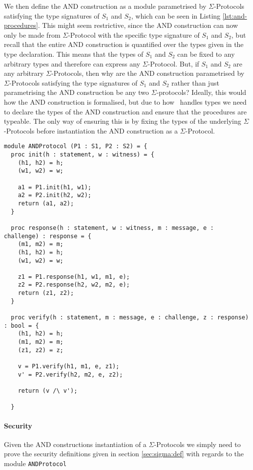 We then define the AND construction as a module parametrised by
$\Sigma$-Protocols satisfying the type signatures of $S_{1}$ and $S_{2}$, which
can be seen in Listing \ref{lst:and-procedures}. This might seem restrictive,
since the AND construction can now only be made from $\Sigma$-Protocol with the
specific type signature of $S_{1}$ and $S_{2}$, but recall that the entire AND
construction is quantified over the types given in the type declaration. This
means that the types of $S_{1}$ and $S_{2}$ can be fixed to any arbitrary types
and therefore can express any $\Sigma$-Protocol.
But, if $S_{1}$ and $S_{2}$ are any arbitrary $\Sigma$-Protocols, then why are
the AND construction parametrised by $\Sigma$-Protocols satisfying the type
signatures of $S_{1}$ and $S_{2}$ rather than just parametrising the AND
construction be any two $\Sigma$-protocols? Ideally, this would how the AND
construction is formalised, but due to how \easycrypt\ handles types we
need to declare the types of the AND construction and ensure that the procedures
are typeable. The only way of ensuring this is by fixing the types of the
underlying $\Sigma$-Protocols before instantiation the AND construction as a $\Sigma$-Protocol.


\begin{lstlisting}[float,label=lst:and-procedures,caption=AND construction]
module ANDProtocol (P1 : S1, P2 : S2) = {
  proc init(h : statement, w : witness) = {
    (h1, h2) = h;
    (w1, w2) = w;

    a1 = P1.init(h1, w1);
    a2 = P2.init(h2, w2);
    return (a1, a2);
  }

  proc response(h : statement, w : witness, m : message, e : challenge) : response = {
    (m1, m2) = m;
    (h1, h2) = h;
    (w1, w2) = w;

    z1 = P1.response(h1, w1, m1, e);
    z2 = P2.response(h2, w2, m2, e);
    return (z1, z2);
  }

  proc verify(h : statement, m : message, e : challenge, z : response) : bool = {
    (h1, h2) = h;
    (m1, m2) = m;
    (z1, z2) = z;

    v = P1.verify(h1, m1, e, z1);
    v' = P2.verify(h2, m2, e, z2);

    return (v /\ v');

  }
\end{lstlisting}

\paragraph{Security}
Given the AND constructions instantiation of a $\Sigma$-Protocols we simply need
to prove the security definitions given in section \ref{sec:sigma:def} with
regards to the module \texttt{ANDProtocol}

